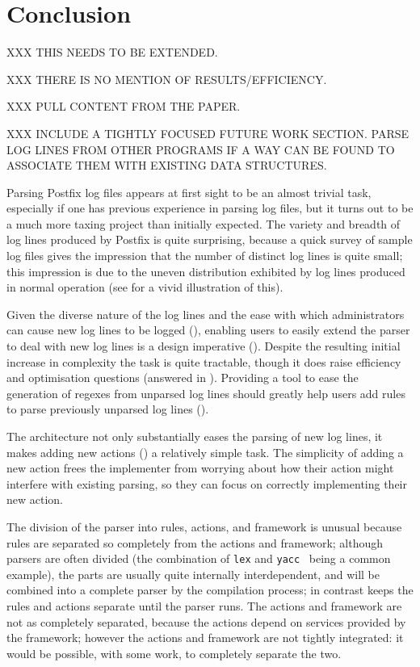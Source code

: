 \chapter{Conclusion}

\label{conclusion}

XXX THIS NEEDS TO BE EXTENDED\@.

XXX THERE IS NO MENTION OF RESULTS/EFFICIENCY\@.

XXX PULL CONTENT FROM THE PAPER\@.

XXX INCLUDE A TIGHTLY FOCUSED FUTURE WORK SECTION\@.  PARSE LOG LINES FROM
OTHER PROGRAMS IF A WAY CAN BE FOUND TO ASSOCIATE THEM WITH EXISTING DATA
STRUCTURES\@.

Parsing Postfix log files appears at first sight to be an almost trivial
task, especially if one has previous experience in parsing log files, but
it turns out to be a much more taxing project than initially expected.  The
variety and breadth of log lines produced by Postfix is quite surprising,
because a quick survey of sample log files gives the impression that the
number of distinct log lines is quite small; this impression is due to the
uneven distribution exhibited by log lines produced in normal operation
(see  for a vivid illustration of this).


Given the diverse nature of the log lines and the ease with which
administrators can cause new log lines to be logged (), enabling users to easily extend the parser to deal with new
log lines is a design imperative ().  Despite the
resulting initial increase in complexity the task is quite tractable,
though it does raise efficiency and optimisation questions (answered in
).  Providing a tool to ease the generation
of regexes from unparsed log lines should greatly help users add rules
to parse previously unparsed log lines ().


The architecture not only substantially eases the parsing of new log lines,
it makes adding new actions () a relatively simple task.  The simplicity of adding a new
action frees the implementer from worrying about how their action might
interfere with existing parsing, so they can focus on correctly
implementing their new action.


The division of the parser into rules, actions, and framework is unusual
because rules are separated so completely from the actions and framework;
although parsers are often divided (the combination of \texttt{lex} and
\texttt{yacc}~\cite{lex-and-yacc-book} being a common example), the parts
are usually quite internally interdependent, and will be combined into a
complete parser by the compilation process; in contrast \parsername{} keeps
the rules and actions separate until the parser runs.  The actions and
framework are not as completely separated, because the actions depend on
services provided by the framework; however the actions and framework are
not tightly integrated: it would be possible, with some work, to completely
separate the two.

